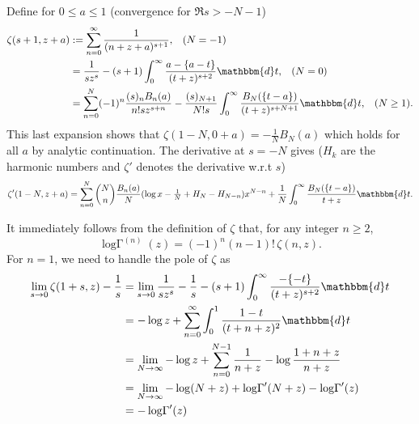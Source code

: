 \documentclass[12pt]{article}
\newcommand{\dd}[0] {\mathbbm{d}}
\newcommand{\logG} {\operatorname {log \Gamma}}
\numberwithin{equation}{section}
\begin{document}
Define for $0 \le a \le 1$ (convergence for $\Re s > -N-1$)
\begin{equation}
\label{equ_hurwitz_asymp}
\begin{alignedat}{6}
\zeta(s+1,z+a) &:= \sum_{n=0}^{\infty}\frac{1}{(n+z+a)^{s+1}} \text{,} \quad (N = -1) \\
&= \frac{1}{s z^s}-(s+1)\int_0^{\infty} \frac{a-\{a-t\}}{(t+z)^{s+2}} \dd t \text{,} \quad (N = 0) \\
&= \sum_{n=0}^{N} (-1)^n \frac{(s)_n B_n(a)}{n! s z^{s+n}}- \frac{(s)_{N+1}}{N! s} \int_{0}^{\infty}\frac{B_N(\{t-a\})}{(t+z)^{s+N+1}} \dd t\text{,} \quad (N \ge 1)\text{.}
\end{alignedat}
\end{equation}
This last expansion shows that $\zeta(1-N,0+a) = -\tfrac{1}{N} B_N(a)$ which holds for all $a$ by analytic continuation. The derivative at $s=-N$ gives ($H_k$ are the harmonic numbers and $\zeta'$ denotes the derivative w.r.t $s$)
\begin{equation}
\label{equ_zeta_prime_asymp}
\zeta'(1-N,z+a) = \sum_{n=0}^{N} \binom{N}{n} \frac{B_n(a)}{N} (\log x - \tfrac{1}{N} + H_{N}-H_{N-n}) x^{N-n} + \frac{1}{N} \int_{0}^{\infty}\frac{B_N(\{t-a\})}{t+z} \dd t\text{.}
\end{equation}

It immediately follows from the definition of $\zeta$ that, for any integer $n \ge 2$,
\begin{equation*}
\logG^{(n)}(z) = (-1)^n (n-1)! \,  \zeta(n,z)\text{.}
\end{equation*}
For $n=1$, we need to handle the pole of $\zeta$ as
\begin{align*}
\lim_{s \to 0} \zeta(1+s,z)-\frac{1}{s} &= \lim_{s \to 0}\frac{1}{s z^s}-\frac{1}{s} -(s+1) \int_0^{\infty} \frac{-\{-t\}}{(t+z)^{s+2}} \dd t\\
&= -\log z + \sum_{n=0}^{\infty} \int_0^1 \frac{1-t}{(t+n+z)^2}\dd t\\
&= \lim_{N\to\infty} -\log z + \sum_{n=0}^{N-1}\frac{1}{n+z} - \log \frac{1+n+z}{n+z}\\
&= \lim_{N\to\infty} -\log(N+z) + \logG'(N+z)-\logG'(z)\\
& = -\logG'(z)
\end{align*}
\end{document}
